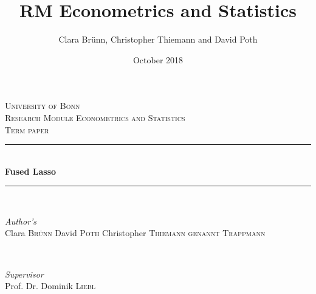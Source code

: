 \documentclass{article}
\title{RM Econometrics and Statistics}
\author{Clara Brünn, Christopher Thiemann and David Poth }
\date{October 2018}
\theoremstyle{definition}
\begin{document}
\begin{titlepage} %
	\newcommand{\HRule}{\rule{\linewidth}{0.5mm}} %
	
	\center %
	
	
	\textsc{\LARGE University of Bonn}\\[1.5cm] %
	
	\textsc{\Large Research Module Econometrics and Statistics}\\[0.5cm] %
	
	\textsc{\large Term paper}\\[0.5cm] %
	
	
	\HRule\\[0.4cm]
	
	{\huge\bfseries Fused Lasso}\\[0.4cm] %
	
	\HRule\\[1.5cm]
	
	
	\begin{minipage}{0.4\textwidth}
		\begin{flushleft}
			\large
			\textit{Author's}\\
			Clara  	\textsc{Brünn} \newline
			David   \textsc{Poth} \newline
			Christopher	\textsc{Thiemann genannt Trappmann}%
		\end{flushleft}
	\end{minipage}
	~
	\begin{minipage}{0.4\textwidth}
		\begin{flushright}
			\large
			\textit{Supervisor}\\
			Prof. Dr. Dominik \textsc{Liebl} %
		\end{flushright}
	\end{minipage}
	

\end{titlepage}
\end{document}
